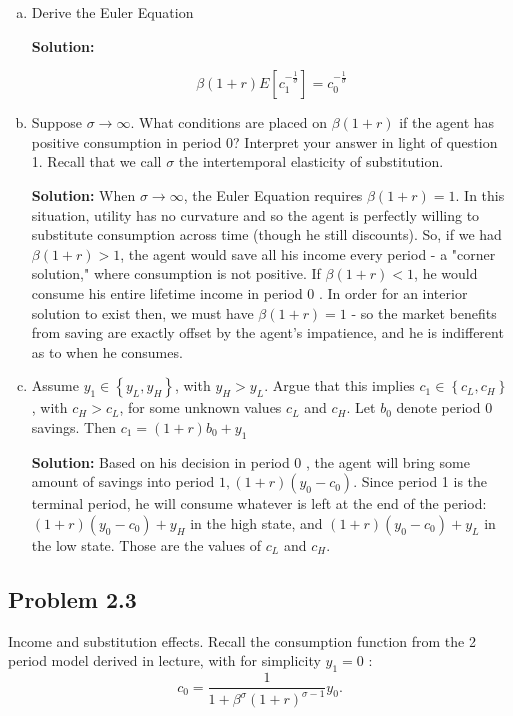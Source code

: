 \documentclass[11pt]{extarticle}
\theoremstyle{plain}
\theoremstyle{definition}
\begin{document}
\begin{enumerate}[(a)]

\item Derive the Euler Equation

\textbf{Solution:} 

$$\beta(1+r) E\left[c_1^{-\frac{1}{\sigma}}\right]=c_0^{-\frac{1}{\sigma}}$$

\item Suppose $\sigma \rightarrow \infty$. What conditions are placed on $\beta(1+r)$ if the agent has positive consumption in period 0? Interpret your answer in light of question 1. Recall that we call $\sigma$ the intertemporal elasticity of substitution.

\textbf{Solution:} When $\sigma \rightarrow \infty$, the Euler Equation requires $\beta(1+r)=1$. In this situation, utility has no curvature and so the agent is perfectly willing to substitute consumption across time (though he still discounts). So, if we had $\beta(1+r)>1$, the agent would save all his income every period - a "corner solution," where consumption is not positive. If $\beta(1+r)<1$, he would consume his entire lifetime income in period 0 . In order for an interior solution to exist then, we must have $\beta(1+r)=1$ - so the market benefits from saving are exactly offset by the agent's impatience, and he is indifferent as to when he consumes.

\item Assume $y_1 \in\left\{y_L, y_H\right\}$, with $y_H>y_L$. Argue that this implies $c_1 \in\left\{c_L, c_H\right\}$, with $c_H>c_L$, for some unknown values $c_L$ and $c_H$. Let $b_0$ denote period 0 savings. Then $c_1=(1+r) b_0+y_1$

\textbf{Solution:}  Based on his decision in period 0 , the agent will bring some amount of savings into period $1,(1+r)\left(y_0-c_0\right)$. Since period 1 is the terminal period, he will consume whatever is left at the end of the period: $(1+r)\left(y_0-c_0\right)+y_H$ in the high state, and $(1+r)\left(y_0-c_0\right)+y_L$ in the low state. Those are the values of $c_L$ and $c_H$.

\end{enumerate}


\subsection*{Problem 2.3}
 Income and substitution effects. Recall the consumption function from the 2 period model derived in lecture, with for simplicity $y_1=0$ :
$$
c_0=\frac{1}{1+\beta^\sigma(1+r)^{\sigma-1}} y_0 .
$$
\end{document}
